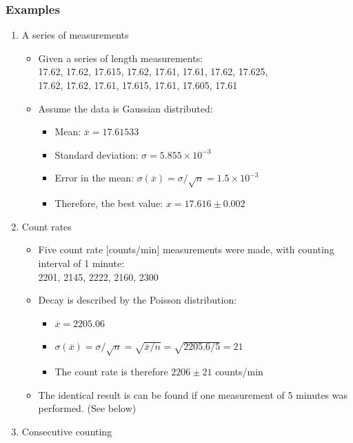\subsubsection{Examples}
\begin{enumerate}
    \item A series of measurements
    \begin{itemize}
        \item Given a series of length measurements:\\
        17.62, 17.62, 17.615, 17.62, 17.61, 17.61, 17.62, 17.625,\\ 17.62, 17.62,
        17.61, 17.615, 17.61, 17.605, 17.61
        \item Assume the data is Gaussian distributed:
        \begin{itemize}
            \item[] Mean: $\overline{x}=17.61533$
            \item[] Standard deviation: $\sigma=5.855\times10^{-3}$
            \item[] Error in the mean: $\sigma(\overline{x})=\sigma/\sqrt{n}=1.5\times10^{-3}$
            \item[] Therefore, the best value: $x=17.616\pm0.002$
        \end{itemize}
    \end{itemize}
    \item Count rates
    \begin{itemize}
        \item Five count rate [counts/min] measurements were made, with counting interval of 1 minute:\\
        2201, 2145, 2222, 2160, 2300
        \item Decay is described by the Poisson distribution:
        \begin{itemize}
            \item[] $\overline{x}=2205.06$
            \item[] $\sigma(\overline{x})=\sigma/\sqrt{n}=\sqrt{\overline{x}/n}=\sqrt{2205.6/5}=21$
            \item[] The count rate is therefore $2206\pm21$ counts/min
        \end{itemize}
        \item The identical result is can be found if one measurement of 5 minutes was performed. (See below)
    \end{itemize}
    \item Consecutive counting
    \begin{itemize}

\end{itemize}
\end{enumerate}
